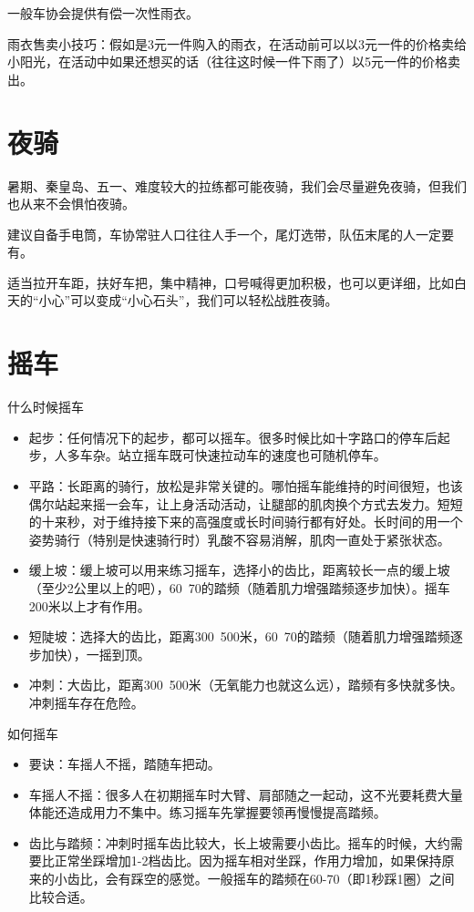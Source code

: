 \documentclass{ctexbook}
\begin{document}
一般车协会提供有偿一次性雨衣。

雨衣售卖小技巧：假如是3元一件购入的雨衣，在活动前可以以3元一件的价格卖给小阳光，在活动中如果还想买的话（往往这时候一件下雨了）以5元一件的价格卖出。
\section{夜骑}
暑期、秦皇岛、五一、难度较大的拉练都可能夜骑，我们会尽量避免夜骑，但我们也从来不会惧怕夜骑。

建议自备手电筒，车协常驻人口往往人手一个，尾灯选带，队伍末尾的人一定要有。

适当拉开车距，扶好车把，集中精神，口号喊得更加积极，也可以更详细，比如白天的“小心”可以变成“小心石头”，我们可以轻松战胜夜骑。


\section{摇车}
什么时候摇车
\begin{itemize}
\item 起步：任何情况下的起步，都可以摇车。很多时候比如十字路口的停车后起步，人多车杂。站立摇车既可快速拉动车的速度也可随机停车。
\item 平路：长距离的骑行，放松是非常关键的。哪怕摇车能维持的时间很短，也该偶尔站起来摇一会车，让上身活动活动，让腿部的肌肉换个方式去发力。短短的十来秒，对于维持接下来的高强度或长时间骑行都有好处。长时间的用一个姿势骑行（特别是快速骑行时）乳酸不容易消解，肌肉一直处于紧张状态。
\item 缓上坡：缓上坡可以用来练习摇车，选择小的齿比，距离较长一点的缓上坡（至少2公里以上的吧），60~70的踏频（随着肌力增强踏频逐步加快）。摇车200米以上才有作用。
\item 短陡坡：选择大的齿比，距离300~500米，60~70的踏频（随着肌力增强踏频逐步加快），一摇到顶。
\item 冲刺：大齿比，距离300~500米（无氧能力也就这么远），踏频有多快就多快。冲刺摇车存在危险。
\end{itemize}
如何摇车
\begin{itemize}
\item 要诀：车摇人不摇，踏随车把动。
\item 车摇人不摇：很多人在初期摇车时大臂、肩部随之一起动，这不光要耗费大量体能还造成用力不集中。练习摇车先掌握要领再慢慢提高踏频。
\item 齿比与踏频：冲刺时摇车齿比较大，长上坡需要小齿比。摇车的时候，大约需要比正常坐踩增加1-2档齿比。因为摇车相对坐踩，作用力增加，如果保持原来的小齿比，会有踩空的感觉。一般摇车的踏频在60-70（即1秒踩1圈）之间比较合适。
\end{itemize}
\end{document}
